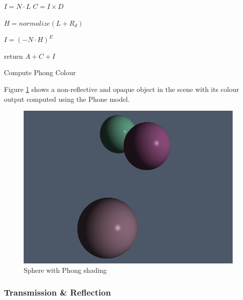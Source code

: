 \documentclass[final]{cmpreport}
\begin{document}
\begin{algorithm}
    \label{phongalgo}
    \SetAlgoLined

    $I = N \cdot L$ 
    $C = I \times D$ 

    $H = normalize(L + R_d)$ 

    $I = (-N \cdot H)^E$ 

    return $A + C + I$
    
    \caption{Compute Phong Colour}
\end{algorithm}

Figure \ref{phong_img} shows a non-reflective and opaque object in the scene with its colour output computed using the Phone model.

\begin{figure}
    \centering
    \includegraphics[width=\textwidth]{img/phong.png}
    \caption{Sphere with Phong shading}
    \label{phong_img}
\end{figure}

\subsubsection{Transmission \& Reflection}
\end{document}

